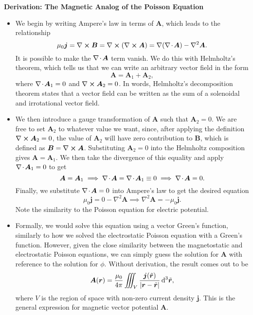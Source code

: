 \documentclass[11pt, a4paper]{article}
\newcommand{\diff}{\mathop{}\!\mathrm{d}} %
\newcommand{\dtr}{\diff^{3} \tilde{\r}}  %
\renewcommand{\vec}[1]{\bm{#1}} %
\renewcommand{\t}[1]{\tilde{#1}} %
\renewcommand{\r}{\vec{r}}
\newcommand{\B}{\vec{B}} %
\newcommand{\A}{\vec{A}} %
\newcommand{\mm}{\mu_{0}}  %
\renewcommand{\j}{\vec{j}}  %
\renewcommand{\div}{\nabla \mspace{-2mu} \cdot \mspace{-2mu}}
\renewcommand{\curl}{\nabla \cross}
\renewcommand{\grad}{\nabla}
\renewcommand{\laplacian}{\nabla^{2}}
\begin{document}
\textbf{Derivation: The Magnetic Analog of the Poisson Equation} \label{ss:magnetic-poisson}
\begin{itemize}

    \item We begin by writing Ampere's law in terms of $ \A $, which leads to the relationship
	\begin{equation*}
		\mm \j = \curl \B = \curl (\curl \A) = \grad (\div \A) - \laplacian \A.
	\end{equation*}
	It is possible to make the $ \div \A $ term vanish. We do this with Helmholtz's theorem, which tells us that we can write an arbitrary vector field in the form
	\begin{equation*}
		\A = \A_{1} + \A_{2},
	\end{equation*}
	where $ \div \A_{1} = 0 $ and $ \curl \A_{2} = 0 $. In words, Helmholtz's decomposition theorem states that a vector field can be written as the sum of a solenoidal and irrotational vector field.
	
    \item We then introduce a gauge transformation of $ \A $ such that $ \A_{2} = 0 $. We are free to set $ \A_{2} $ to whatever value we want, since, after applying the definition $ \curl \A_{2} = 0 $, the value of $ \A_{2} $ will have zero contribution to $ \B $, which is defined as $ \B = \curl \A $. Substituting $ \A_{2} = 0 $ into the Helmholtz composition gives $ \A = \A_{1} $. We then take the divergence of this equality and apply $ \div \A_{1} = 0 $ to get
    \begin{equation*}
        \A = \A_{1} \implies \div \A = \div \A_{1} \equiv 0 \implies \div \A = 0.
    \end{equation*}
    Finally, we substitute $ \div \A = 0 $ into Ampere's law to get the desired equation
    \begin{equation*}
        \mm \j = 0 - \laplacian \A \implies \laplacian \A = - \mm \j.
    \end{equation*}
	Note the similarity to the Poisson equation for electric potential.
	
    \item Formally, we would solve this equation using a vector Green's function, similarly to how we solved the electrostatic Poisson equation with a Green's function. However, given the close similarity between the magnetostatic and electrostatic Poisson equations, we can simply guess the solution for $ \A $ with reference to the solution for $ \phi $. Without derivation, the result comes out to be
	\begin{equation*}
		\A(\r) = \frac{\mm}{4\pi} \iiint_{V} \frac{\j(\t{\r})}{\abs{\r - \t{\r}}} \dtr,
	\end{equation*}
	where $ V $ is the region of space with non-zero current density $ \j $. This is the general expression for magnetic vector potential $ \A $. 
	
\end{itemize}
\end{document}

